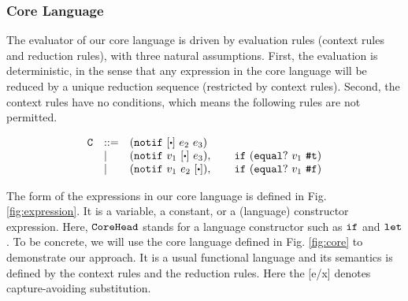 \subsubsection{Core Language}


The evaluator of our core language is driven by evaluation rules (context rules and reduction rules), with three natural assumptions. First, the evaluation is deterministic, in the sense that any expression in the core language will be reduced by a unique reduction sequence (restricted by context rules). Second, the context rules have no conditions, which means the following rules are not permitted.

{\footnotesize
\[
\begin{array}{lll}
\m{C}& ::= & (\m{notif}~[\bigcdot]~e_2~e_3)\\
&|& (\m{notif}~v_1~[\bigcdot]~e_3), \qquad \m{if}~(\m{equal}?~v_1~\m{\true})\\
&|& (\m{notif}~v_1~e_2~[\bigcdot]), \qquad \m{if}~(\m{equal}?~v_1~\m{\false})
\end{array}
\]}

The form of the expressions in our core language is defined in Fig. \ref{fig:expression}. It is a variable, a constant, or a (language) constructor expression. Here, $\mbox{\tt CoreHead}$ stands for a language constructor such as $\mbox{\tt if}$ and $\mbox{\tt let}$. To be concrete, we will use the core language defined in Fig.  \ref{fig:core} to demonstrate our approach. It is a usual functional language and its semantics is defined by the context rules and the reduction rules. Here the [e/x] denotes capture-avoiding substitution.

